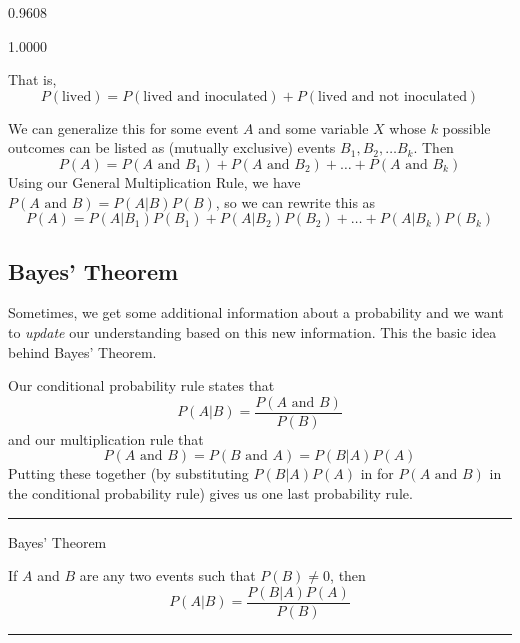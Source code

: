 \documentclass[
]{book}
\begin{document}
0.9608

{1.0000}

That is,
\[
  P(\text{lived}) = P(\text{lived and inoculated}) + 
  P(\text{lived and not inoculated})
\]

We can generalize this for some event \(A\) and some variable \(X\) whose \(k\) possible outcomes can be listed as (mutually exclusive) events \(B_1, B_2, \dots B_k\). Then \[P(A) = P(A \text{ and }B_1) + P(A \text{ and }B_2) + \dots + P(A \text{ and }B_k) \]
Using our General Multiplication Rule, we have \(P(A \text{ and }B) = P(A|B)P(B)\), so we can rewrite this as
\[P(A) = P(A|B_1)P(B_1) + P(A|B_2)P(B_2) + \dots + P(A|B_k)P(B_k) \]

\subsection{Bayes' Theorem}\label{bayes-theorem}

Sometimes, we get some additional information about a probability and we want to \emph{update} our understanding based on this new information. This the basic idea behind Bayes' Theorem.

Our conditional probability rule states that \[P(A|B) = \frac{P(A \text{ and } B)}{P(B)}\] and our multiplication rule that \[P(A \text{ and } B) = P(B \text{ and } A) = P(B|A)P(A)\] Putting these together (by substituting \(P(B|A)P(A)\) in for \(P(A \text{ and } B)\) in the conditional probability rule) gives us one last probability rule.

\begin{center}\rule{0.5\linewidth}{0.5pt}\end{center}

Bayes' Theorem

If \(A\) and \(B\) are any two events such that \(P(B)\ne0\), then \[P(A|B) = \frac{P(B|A)P(A)}{P(B)}\]

\begin{center}\rule{0.5\linewidth}{0.5pt}\end{center}
\end{document}
